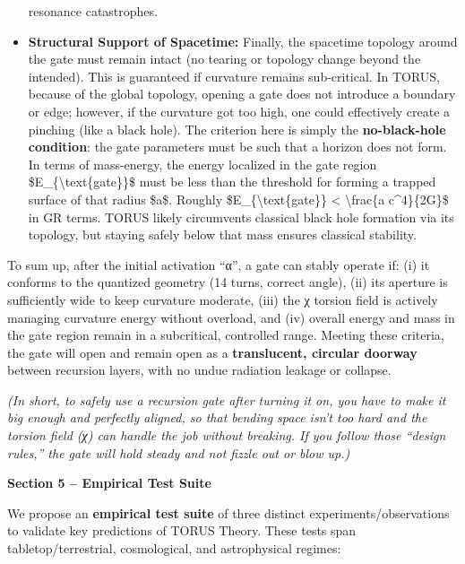 \documentclass[]{article}
\begin{document}
\begin{itemize}
  resonance catastrophes.
\item
  \textbf{Structural Support of Spacetime:} Finally, the spacetime
  topology around the gate must remain intact (no tearing or topology
  change beyond the intended). This is guaranteed if curvature remains
  sub-critical. In TORUS, because of the global topology, opening a gate
  does not introduce a boundary or edge; however, if the curvature got
  too high, one could effectively create a pinching (like a black hole).
  The criterion here is simply the \textbf{no-black-hole condition}: the
  gate parameters must be such that a horizon does not form. In terms of
  mass-energy, the energy localized in the gate region
  \$E\_\{\textbackslash{}text\{gate\}\}\$ must be less than the
  threshold for forming a trapped surface of that radius \$a\$. Roughly
  \$E\_\{\textbackslash{}text\{gate\}\} \textless{}
  \textbackslash{}frac\{a c\^{}4\}\{2G\}\$ in GR terms. TORUS likely
  circumvents classical black hole formation via its topology, but
  staying safely below that mass ensures classical stability.
\end{itemize}

To sum up, after the initial activation ``α'', a gate can stably operate
if: (i) it conforms to the quantized geometry (14 turns, correct angle),
(ii) its aperture is sufficiently wide to keep curvature moderate, (iii)
the χ torsion field is actively managing curvature energy without
overload, and (iv) overall energy and mass in the gate region remain in
a subcritical, controlled range. Meeting these criteria, the gate will
open and remain open as a \textbf{translucent, circular doorway} between
recursion layers, with no undue radiation leakage or collapse.

\emph{(In short, to safely use a recursion gate after turning it on, you
have to make it big enough and perfectly aligned, so that bending space
isn't too hard and the torsion field (χ) can handle the job without
breaking. If you follow those ``design rules,'' the gate will hold
steady and not fizzle out or blow up.)}

\textbf{Section 5 -- Empirical Test Suite}

We propose an \textbf{empirical test suite} of three distinct
experiments/observations to validate key predictions of TORUS Theory.
These tests span tabletop/terrestrial, cosmological, and astrophysical
regimes:
\end{document}
